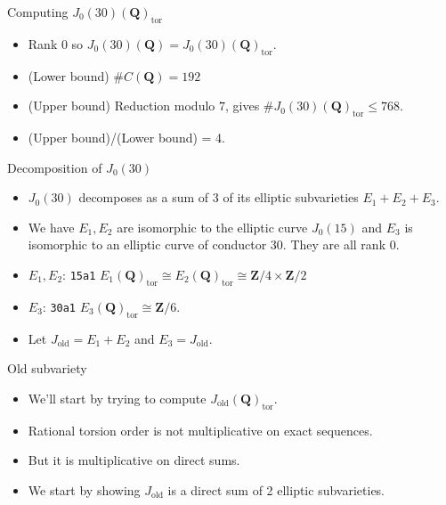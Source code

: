 \documentclass{beamer}
\newcommand{\QQ}{\mathbf{Q}}
\newcommand{\ZZ}{\mathbf{Z}}
\renewcommand{\ZZ}{\mathbf{Z}}
\newcommand{\tor}{\mathrm{tor}}
\newcommand{\old}{\mathrm{old}}
\begin{document}
\begin{frame}{Computing $J_0(30)(\QQ)_\tor$}
    \begin{itemize}
        \item
            Rank 0 so $J_0(30)(\QQ)=J_0(30)(\QQ)_\tor$.
        \item
            (Lower bound) $\#C(\QQ)=192$
        \item
            (Upper bound) Reduction modulo $7$, gives $\# J_0(30)(\QQ)_\tor\leq
            768$.
        \item
            (Upper bound)/(Lower bound) = 4.
    \end{itemize}
\end{frame}

\begin{frame}{Decomposition of $J_0(30)$}
    \begin{itemize}
        \item
            $J_0(30)$ decomposes as a sum of 3 of its elliptic subvarieties
            $E_1+E_2+E_3$.
        \item
            We have $E_1, E_2$ are isomorphic to the elliptic curve $J_0(15)$
            and $E_3$ is isomorphic to an elliptic curve of conductor 30. They
            are all rank 0.
        \item
            $E_1, E_2$: \texttt{15a1} $E_1(\QQ)_\tor \cong E_2(\QQ)_\tor \cong
            \ZZ/4\times \ZZ/2$
        \item
            $E_3$: \texttt{30a1} $E_3(\QQ)_\tor \cong \ZZ/6$.
        \item
            Let $J_\old=E_1+E_2$ and $E_3=J_\old$.
    \end{itemize}
\end{frame}

\begin{frame}{Old subvariety}
    \begin{itemize}
        \item
            We'll start by trying to compute $J_\old(\QQ)_\tor$.
        \item
            Rational torsion order is not multiplicative on exact sequences.
        \item
            But it is multiplicative on direct sums.
        \item
            We start by showing $J_\old$ is a direct sum of 2 elliptic
            subvarieties.
    \end{itemize}
\end{frame}
\end{document}
